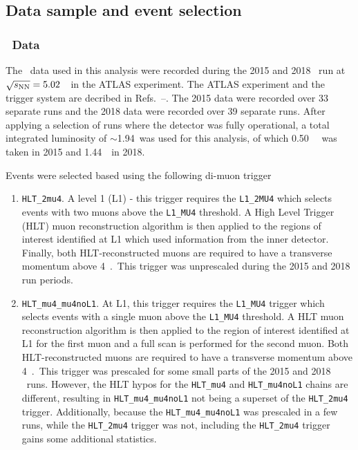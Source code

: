 \subsection{Data sample and event selection\label{sec:data}}

\subsubsection{\PbPb\ Data\label{sec:data_PbPb}}

The \PbPb\ data used in this analysis were recorded during the 2015 and 2018 \PbPb\ run 
  at $\mbox{$\sqrt{s_{\mathrm {NN}}}$}=5.02$~\TeV\ in the ATLAS experiment. 
The ATLAS experiment and the trigger system are decribed 
  in Refs.~\cite{PERF-2007-01}--\cite{TRIG-2016-01}.
The 2015 data were recorded over 33 separate runs and the 2018 data were 
  recorded over 39 separate runs. 
After applying a selection of runs where the detector was fully operational, 
  a total integrated luminosity of $\sim$1.94~\inb was used for this analysis, 
  of which 0.50~\inb~\cite{Arratia:2152730} was taken in 2015
  and 1.44~\inb\ in 2018.


Events were selected based using the following di-muon trigger 
\begin{enumerate}
\item \verb=HLT_2mu4=. A level 1 (L1) - this trigger requires the \verb=L1_2MU4= 
     which selects events with two muons above the \verb=L1_MU4= threshold. 
   A High Level Trigger (HLT) muon reconstruction algorithm is then applied to the regions of 
     interest identified at L1 which used information from the inner detector.
   Finally, both HLT-reconstructed muons are required to have a transverse momentum above 4~\GeV.\
   This trigger was unprescaled during the 2015 and 2018 run periods.

\item \verb=HLT_mu4_mu4noL1=. At L1,  this trigger requires the \verb=L1_MU4=
  trigger which selects events with a single muon above the \verb=L1_MU4= 
    threshold. 
  A HLT muon reconstruction algorithm is then applied to the 
    region of interest identified at L1 for the first muon and a full scan
    is performed for the second muon.
  Both HLT-reconstructed muons are required to have a transverse momentum above 4~\GeV.\
  This trigger was prescaled for some small parts of the 2015 and 2018 \PbPb\ runs.
  However, the HLT hypos for the \verb=HLT_mu4= and \verb=HLT_mu4noL1= 
    chains are different, resulting in \verb=HLT_mu4_mu4noL1= not being 
    a superset of the \verb=HLT_2mu4= trigger.
  Additionally, because the \verb=HLT_mu4_mu4noL1= was prescaled in a few runs,
    while the \verb=HLT_2mu4= trigger was not, including the \verb=HLT_2mu4=
    trigger gains some additional statistics.
\end{enumerate}


